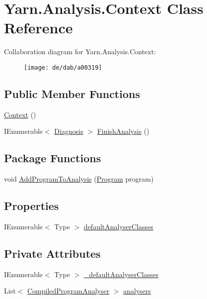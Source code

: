 \hypertarget{a00031}{\section{Yarn.\-Analysis.\-Context Class Reference}
\label{a00031}
}


Collaboration diagram for Yarn.\-Analysis.\-Context\-:
\nopagebreak
\begin{figure}[H]
\begin{center}
\leavevmode
\texttt{[image: de/dab/a00319]}
\end{center}
\end{figure}
\subsection*{Public Member Functions}
\begin{DoxyCompactItemize}
\item 
\hyperlink{a00031_a8e2c56843e8d374b0f90e23326d8d14a}{Context} ()
\item 
I\-Enumerable$<$ \hyperlink{a00035}{Diagnosis} $>$ \hyperlink{a00031_a1eadea062a5899a64d00ea0172cbbb43}{Finish\-Analysis} ()
\end{DoxyCompactItemize}
\subsection*{Package Functions}
\begin{DoxyCompactItemize}
\item 
void \hyperlink{a00031_a60255a6d54f296d199507acef251244c}{Add\-Program\-To\-Analysis} (\hyperlink{a00067}{Program} program)
\end{DoxyCompactItemize}
\subsection*{Properties}
\begin{DoxyCompactItemize}
\item 
I\-Enumerable$<$ Type $>$ \hyperlink{a00031_afdf24f2512251c2203ba1bde8f4a0f90}{default\-Analyser\-Classes}
\end{DoxyCompactItemize}
\subsection*{Private Attributes}
\begin{DoxyCompactItemize}
\item 
I\-Enumerable$<$ Type $>$ \hyperlink{a00031_ad06829cf848a5936db5724ebced758ec}{\-\_\-default\-Analyser\-Classes}
\item 
List$<$ \hyperlink{a00028}{Compiled\-Program\-Analyser} $>$ \hyperlink{a00031_aa5c7eaa90ad9c47969a3b336080d8991}{analysers}
\end{DoxyCompactItemize}


